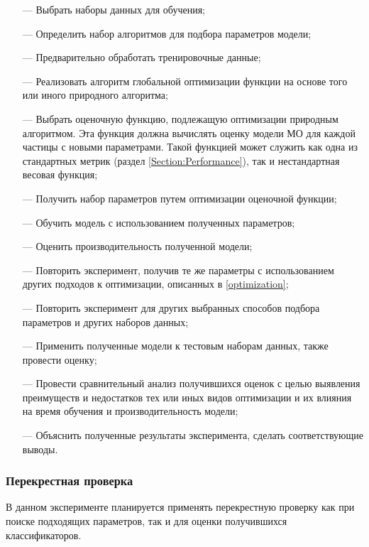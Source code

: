 \begin{itemize}
      \item[—] Выбрать наборы данных для обучения;
      \item[—] Определить набор алгоритмов для подбора параметров модели;
      \item[—] Предварительно обработать тренировочные данные;
      \item[—] Реализовать алгоритм глобальной оптимизации функции на основе того или иного природного алгоритма;
      \item[—] Выбрать оценочную функцию, подлежащую оптимизации природным алгоритмом.
            Эта функция должна вычислять оценку модели МО для каждой частицы с новыми параметрами.
            Такой функцией может служить как одна из стандартных метрик (раздел \ref{Section:Performance}), так и
            нестандартная весовая функция;
      \item[—] Получить набор параметров путем оптимизации оценочной функции; 
      \item[—] Обучить модель с использованием полученных параметров;
      \item[—] Оценить производительность полученной модели;
      \item[—] Повторить эксперимент, получив те же параметры с использованием
            других подходов к оптимизации, описанных в \ref{optimization};
      \item[—] Повторить эксперимент для других выбранных способов подбора параметров и других наборов данных;
      \item[—] Применить полученные модели к тестовым наборам данных, также провести оценку;
      \item[—] Провести сравнительный анализ получившихся оценок с целью выявления
            преимуществ и недостатков тех или иных видов оптимизации и их влияния на
            время обучения и производительность модели;
      \item[—] Объяснить полученные результаты эксперимента, сделать соответствующие выводы.
\end{itemize}

\subsubsection{Перекрестная проверка}

В данном эксперименте планируется применять перекрестную проверку как при поиске подходящих параметров, 
так и для оценки получившихся классификаторов. 

